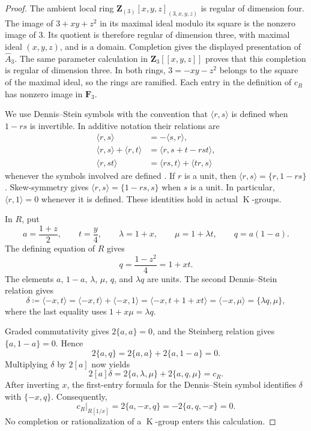 \documentclass[11pt,a4paper]{amsart}
\numberwithin{equation}{section}
\theoremstyle{definition}
\theoremstyle{remark}
\newcommand{\CthreeZ}{\mathbf{Z}}
\newcommand{\CthreeF}{\mathbf{F}}
\DeclareMathOperator{\CthreeK}{K}
\begin{document}
\begin{proof}
The ambient local ring
$\CthreeZ_{(3)}[x,y,z]_{(3,x,y,z)}$ is regular of dimension four.
The image of $3+xy+z^2$ in its maximal ideal modulo its square is the
nonzero image of $3$.
Its quotient is therefore regular of dimension three, with maximal
ideal $(x,y,z)$, and is a domain.
Completion gives the displayed presentation of $\widehat A_3$.
The same parameter calculation in $\CthreeZ_3[[x,y,z]]$ proves that this
completion is regular of dimension three.
In both rings, $3=-xy-z^2$ belongs to the square of the maximal ideal,
so the rings are ramified.
Each entry in the definition of $c_R$ has nonzero image in $\CthreeF_3$.

We use Dennis--Stein symbols with the convention that
$\langle r,s\rangle$ is defined when $1-rs$ is invertible.
In additive notation their relations are
\begin{align*}
 \langle r,s\rangle&=-\langle s,r\rangle,\\
 \langle r,s\rangle+\langle r,t\rangle
   &=\langle r,s+t-rst\rangle,\\
 \langle r,st\rangle
   &=\langle rs,t\rangle+\langle tr,s\rangle
\end{align*}
whenever the symbols involved are defined
\cite[III, Definition~5.11, relations (D1)--(D3)]{Weibel}.
If $r$ is a unit, then
$\langle r,s\rangle=\{r,1-rs\}$.
Skew-symmetry gives
$\langle r,s\rangle=\{1-rs,s\}$ when $s$ is a unit.
In particular, $\langle r,1\rangle=0$ whenever it is defined.
These identities hold in actual $\CthreeK$-groups.

In $R$, put
\[
 a=\frac{1+z}{2},\qquad t=\frac y4,\qquad
 \lambda=1+x,\qquad \mu=1+\lambda t,\qquad q=a(1-a).
\]
The defining equation of $R$ gives
\[
 q=\frac{1-z^2}{4}=1+xt.
\]
The elements $a$, $1-a$, $\lambda$, $\mu$, $q$, and $\lambda q$
are units. The second Dennis--Stein relation gives
\[
 \delta\coloneqq \langle -x,t\rangle
   =\langle -x,t\rangle+\langle -x,1\rangle
   =\langle -x,t+1+xt\rangle
   =\langle -x,\mu\rangle
   =\{\lambda q,\mu\},
\]
where the last equality uses $1+x\mu=\lambda q$.

Graded commutativity gives $2\{a,a\}=0$, and the Steinberg relation
gives $\{a,1-a\}=0$. Hence
\[
 2\{a,q\}=2\{a,a\}+2\{a,1-a\}=0.
\]
Multiplying $\delta$ by $2[a]$ now yields
\[
 2[a]\delta
   =2\{a,\lambda,\mu\}+2\{a,q,\mu\}
   =c_R.
\]
After inverting $x$, the first-entry formula for the Dennis--Stein
symbol identifies $\delta$ with $\{-x,q\}$. Consequently,
\[
 c_R|_{R[1/x]}
   =2\{a,-x,q\}
   =-2\{a,q,-x\}
   =0.
\]
No completion or rationalization of a $\CthreeK$-group enters this calculation.
\end{proof}
\end{document}
